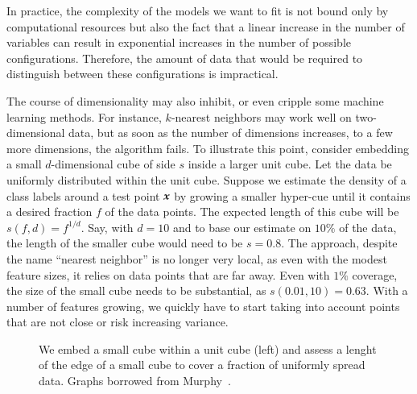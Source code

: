 \begin{refsection}
In practice, the complexity of the models we want to fit is not bound only by computational resources but also the fact that a linear increase in the number of variables can result in exponential increases in the number of possible configurations. Therefore, the amount of data that would be required to distinguish between these configurations is impractical. 

The course of dimensionality may also inhibit, or even cripple some machine learning methods. For instance, $k$-nearest neighbors may work well on two-dimensional data, but as soon as the number of dimensions increases, to a few more dimensions, the algorithm fails. To illustrate this point, consider embedding a small $d$-dimensional cube of side $s$ inside a larger unit cube. Let the data be uniformly distributed within the unit cube. Suppose we estimate the density of a class labels around a test point $\boldsymbol{x}$ by growing a smaller hyper-cue until it contains a desired fraction $f$ of the data points. The expected length of this cube will be $s(f,d)=f^{1/d}$. Say, with $d=10$ and to base our estimate on $10\%$ of the data, the length of the smaller cube would need to be $s=0.8$. The approach, despite the name ``nearest neighbor'' is no longer very local, as even with the modest feature sizes, it relies on data points that are far away. Even with $1\%$ coverage, the size of the small cube needs to be substantial, as $s(0.01,10)=0.63$. With a number of features growing, we quickly have to start taking into account points that are not close or risk increasing variance.

\begin{figure}[htbp]
\label{fig:lr-overfitting}
\caption{We embed a small cube within a unit cube (left) and assess a lenght of the edge of a small cube to cover a fraction of uniformly spread data. Graphs borrowed from Murphy~\cite{2012-Murphy}.}
\end{figure}


\printbibliography[heading=subbibliography]
\end{refsection}
